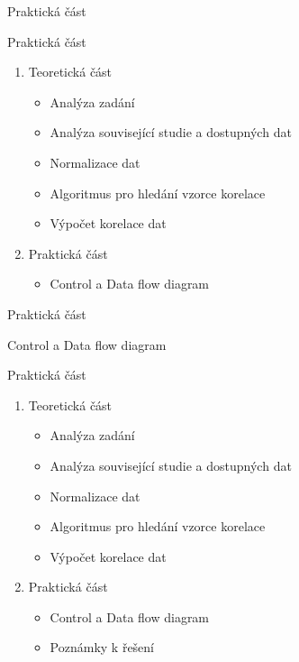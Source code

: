\documentclass[aspectratio=169, xcolor=dvipsnames]{beamer}
\begin{document}
\begin{frame}{}
  \begin{center}
    Praktická část
  \end{center} 
\end{frame}

\begin{frame}{Praktická část}
	\begin{enumerate}
    \item Teoretická část
      \begin{itemize}
        \item Analýza zadání 
        \item Analýza související studie a dostupných dat 
        \item Normalizace dat
        \item Algoritmus pro hledání vzorce korelace
        \item Výpočet korelace dat
      \end{itemize}

    \item Praktická část
      \begin{itemize}
        \item Control a Data flow diagram
      \end{itemize}
  \end{enumerate}
\end{frame}

\begin{frame}{Praktická část}
  \begin{center}
    Control a Data flow diagram
  \end{center} 
\end{frame}

\begin{frame}{Praktická část}
	\begin{enumerate}
    \item Teoretická část
      \begin{itemize}
        \item Analýza zadání 
        \item Analýza související studie a dostupných dat 
        \item Normalizace dat
        \item Algoritmus pro hledání vzorce korelace
        \item Výpočet korelace dat
      \end{itemize}

    \item Praktická část
      \begin{itemize}
        \item Control a Data flow diagram
        \item Poznámky k řešení
      \end{itemize}
  \end{enumerate}
\end{frame}
\end{document}
